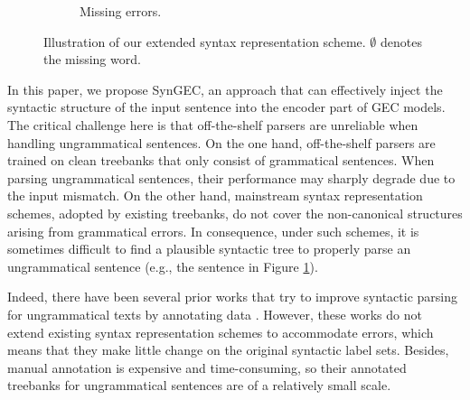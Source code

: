 \documentclass[11pt]{article}
\begin{document}
\begin{figure*}[th!]
\begin{subfigure}[b]{0.2\textwidth}
{\begin{dependency}
{      
        }
    \end{dependency}
    }
    \caption{Missing errors.}
    \label{fig:m-error}
  \end{subfigure}
  \hfill
  \caption{Illustration of our extended syntax representation scheme. $\emptyset$ denotes the missing word.}
  \label{fig:scheme-three-error-types}
\end{figure*} 
In this paper, we propose SynGEC, an approach that can effectively inject the syntactic structure of the input sentence into the encoder part of GEC models. 
The critical challenge here is that 
off-the-shelf parsers are unreliable when handling ungrammatical sentences. 
On the one hand, 
off-the-shelf parsers are trained on clean treebanks that only consist of  grammatical sentences. When parsing ungrammatical sentences, their performance may sharply degrade due to the input mismatch. 
On the other hand, mainstream syntax representation schemes, adopted by existing treebanks, do not cover the non-canonical structures arising from grammatical errors.
In consequence, under such schemes, it is sometimes difficult to find a plausible syntactic tree to properly parse an ungrammatical sentence (e.g., the sentence in Figure \ref{fig:m-error}).




Indeed, there have been several prior works that try to improve syntactic parsing for ungrammatical texts by annotating data  \citep{dickinson2009dependency,DBLP:conf/acl/BerzakKSWLMGK16,nagata2016phrase}. 
However, these works do not extend 
existing syntax representation schemes to accommodate errors, which means that they make little change on the original syntactic label sets. 
Besides, manual annotation is expensive and time-consuming, so their annotated treebanks for ungrammatical sentences are of a relatively small scale. 
\end{document}
